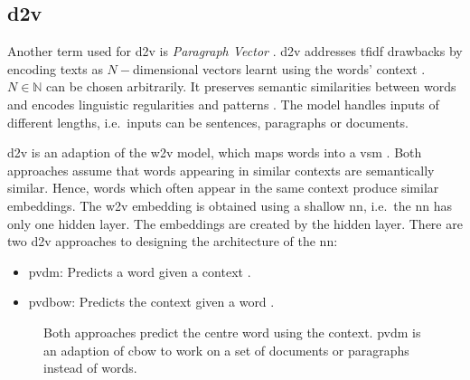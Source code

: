 \subsection{\acl*{d2v}}\label{subsec:doc2vec}

Another term used for \ac{d2v} is \textit{Paragraph Vector} \cite{clusteringDocs2020, SentRep2014}.
\ac{d2v} addresses \ac{tfidf} drawbacks by encoding texts as $N-$dimensional vectors learnt using the words' context \cite{clusteringDocs2020}.
$N \in \mathbb{N}$ can be chosen arbitrarily.
It preserves semantic similarities between words and encodes linguistic regularities and patterns \cite{SkipGram2013}.
The model handles inputs of different lengths, i.e.\ inputs can be sentences, paragraphs or documents.

\ac{d2v} is an adaption of the \ac{w2v} model, which maps words into a \ac{vsm} \cite{clusteringDocs2020}.
Both approaches assume that words appearing in similar contexts are semantically similar. %
Hence, words which often appear in the same context produce similar embeddings.
The \ac{w2v} embedding is obtained using a shallow \ac{nn}, i.e.\ the \ac{nn} has only one hidden layer.
The embeddings are created by the hidden layer.
There are two \ac{d2v} approaches to designing the architecture of the \ac{nn}:
\begin{itemize}
    \item \ac{pvdm}: 
        Predicts a word given a context \cite{SentRep2014, WordRep2013}.
    \item \ac{pvdbow}: 
        Predicts the context given a word \cite{EmbDist2015, SkipGram2013, SentRep2014}.
\end{itemize}


\begin{figure}%
    \centering
    \qquad
    \caption[\acs*{cbow} and \acs*{pvdm} architecture]{Both approaches predict the centre word using the context.
    \acs*{pvdm} is an adaption of \acs*{cbow} to work on a set of documents or paragraphs instead of words.
    }%
    \label{fig:pvdm}%
\end{figure}
 
